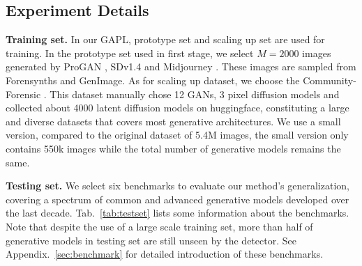 \subsection{Experiment Details}
    \textbf{Training set.} In our GAPL, prototype set and scaling up set are used for training. In the prototype set used in first stage, we select $M = 2000$ images generated by ProGAN \cite{karras2018progressive}, SDv1.4 \cite{rombach2022high} and Midjourney \cite{Midjourney}. These images are sampled from Forensynths and GenImage. As for scaling up dataset, we choose the Community-Forensic \cite{park2025commfor}. This dataset manually chose 12 GANs, 3 pixel diffusion models and collected about 4000 latent diffusion models on huggingface, constituting a large and diverse datasets that covers most generative architectures. We use a small version, compared to the original dataset of 5.4M images, the small version only contains 550k images while the total number of generative models remains the same.

 \begin{table}[t]
        \centering
        \caption{The selected 6 AIGI benchmarks to evaluate the methods.}
        \label{tab:testset}
    \end{table}
    
    \textbf{Testing set.} We select six benchmarks to evaluate our method's generalization, covering a spectrum of common and advanced generative models developed over the last decade. Tab.~\ref{tab:testset} lists some information about the benchmarks. Note that despite the use of a large scale training set, more than half of generative models in testing set are still unseen by the detector. See Appendix.~\ref{sec:benchmark} for detailed introduction of these benchmarks.

